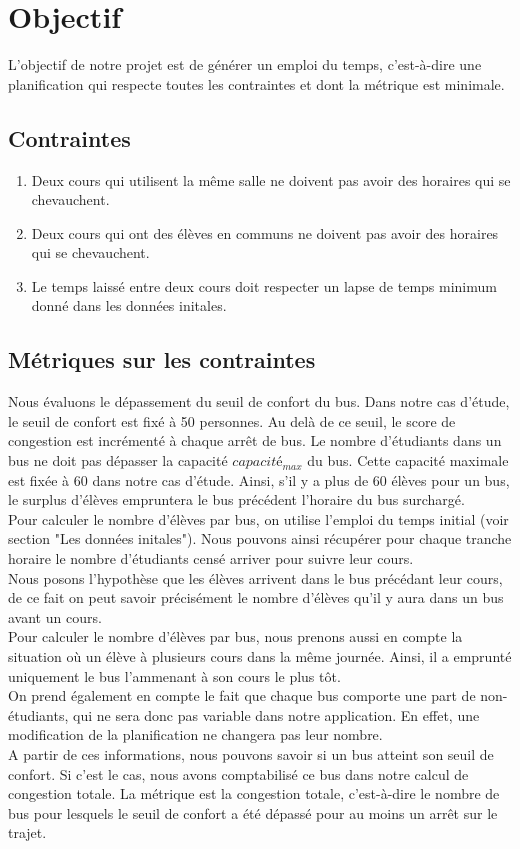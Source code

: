 \documentclass[a4paper,11pt]{article}
\begin{document}
\section{Objectif}
	L'objectif de notre projet est de générer un emploi du temps, c'est-à-dire une planification qui respecte toutes les contraintes et dont la métrique est minimale.
	\subsection{Contraintes}
		\begin{enumerate}
			\item Deux cours qui utilisent la même salle ne doivent pas avoir des horaires qui se chevauchent.
			\item Deux cours qui ont des élèves en communs ne doivent pas avoir des horaires qui se chevauchent.
			\item Le temps laissé entre deux cours doit respecter un lapse de temps minimum donné dans les données initales.
		\end{enumerate}
	
	\subsection{Métriques sur les contraintes}
		Nous évaluons le dépassement du seuil de confort du bus. Dans notre cas d'étude, le seuil de confort est fixé à 50 personnes. Au delà de ce seuil, le score de congestion est incrémenté à chaque arrêt de bus.
		Le nombre d'étudiants dans un bus ne doit pas dépasser la capacité $capacité_{max}$ du bus. Cette capacité maximale est fixée à 60 dans notre cas d'étude. Ainsi, s'il y a plus de 60 élèves pour un bus, le surplus d'élèves empruntera le bus précédent l'horaire du bus surchargé.\\
		Pour calculer le nombre d'élèves par bus, on utilise l'emploi du temps initial (voir section "Les données initales"). Nous pouvons ainsi récupérer pour chaque tranche horaire le nombre d'étudiants censé arriver pour suivre leur cours.\\
		Nous posons l'hypothèse que les élèves arrivent dans le bus précédant leur cours, de ce fait on peut savoir précisément le nombre d'élèves qu'il y aura dans un bus avant un cours.\\
		Pour calculer le nombre d'élèves par bus, nous prenons aussi en compte la situation où un élève à plusieurs cours dans la même journée. Ainsi, il a emprunté uniquement le bus l'ammenant à son cours le plus tôt.\\
		On prend également en compte le fait que chaque bus comporte une part de non-étudiants, qui ne sera donc pas variable dans notre application. En effet, une modification de la planification ne changera pas leur nombre.\\
		A partir de ces informations, nous pouvons savoir si un bus atteint son seuil de confort. Si c'est le cas, nous avons comptabilisé ce bus dans notre calcul de congestion totale. La métrique est la congestion totale, c'est-à-dire le nombre de bus pour lesquels le seuil de confort a été dépassé pour au moins un arrêt sur le trajet.
		
\end{document}
